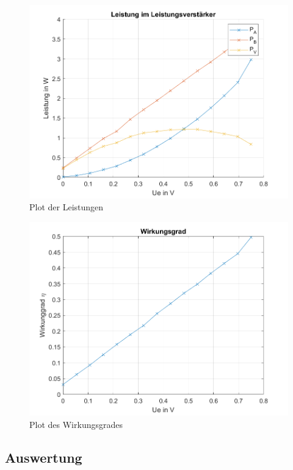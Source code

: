 \documentclass{article}
\begin{document}
\begin{figure}[h]
  \centering
  \includegraphics[width=\textwidth]{../assets/images/ELP2_4/Leistung.png}
  \caption{Plot der Leistungen}
  \label{fig:powerplot}
\end{figure}


\begin{figure}[h]
  \centering
  \includegraphics[width=\textwidth]{../assets/images/ELP2_4/Wirkungsgrad.png}
  \caption{Plot des Wirkungsgrades}
  \label{fig:eff}
\end{figure}

\subsection{Auswertung}
\label{sec:auswertung-2}




{}
\end{document}

